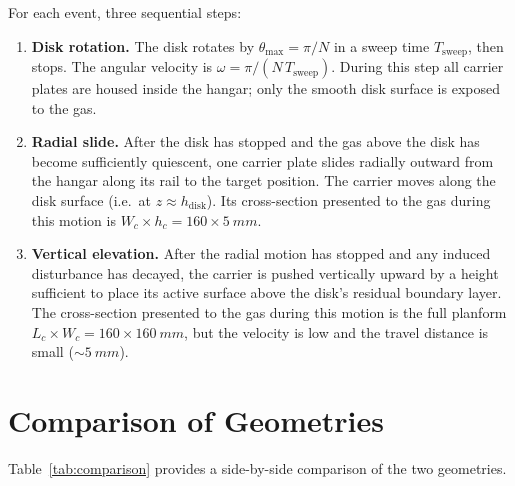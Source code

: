 \documentclass[11pt,a4paper]{article}
\begin{document}
For each event, three sequential steps:
\begin{enumerate}
  \item \textbf{Disk rotation.} The disk rotates by
        $\theta_\mathrm{max} = \pi/N$ in a sweep time
        $T_\mathrm{sweep}$, then stops. The angular velocity is
        $\omega = \pi/(N\,T_\mathrm{sweep})$. During this step all
        carrier plates are housed inside the hangar; only the smooth
        disk surface is exposed to the gas.

  \item \textbf{Radial slide.} After the disk has stopped and the gas
        above the disk has become sufficiently quiescent, one carrier
        plate slides radially outward from the hangar along its rail to
        the target position. The carrier moves along the disk surface
        (i.e.\ at $z \approx h_\mathrm{disk}$). Its cross-section
        presented to the gas during this motion is
        $W_c \times h_c = 160 \times \SI{5}{mm}$.

  \item \textbf{Vertical elevation.} After the radial motion has
        stopped and any induced disturbance has decayed, the carrier is
        pushed vertically upward by a height sufficient to place its
        active surface above the disk's residual boundary layer. The
        cross-section presented to the gas during this motion is the
        full planform $L_c \times W_c = 160 \times \SI{160}{mm}$, but
        the velocity is low and the travel distance is small
        ($\sim\SI{5}{mm}$).
\end{enumerate}


\section{Comparison of Geometries}
\label{sec:comparison}

Table~\ref{tab:comparison} provides a side-by-side comparison of the
two geometries.
\end{document}
